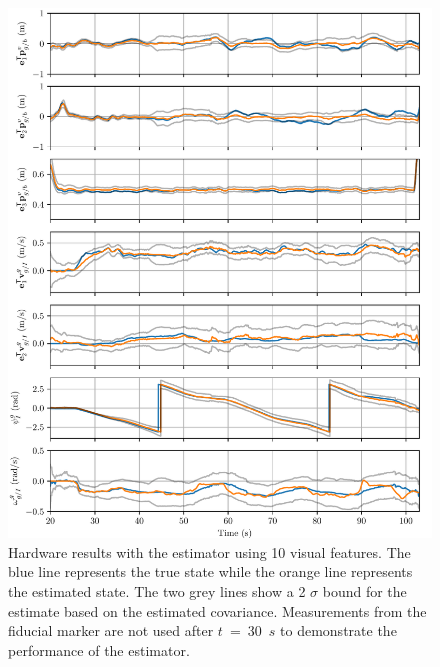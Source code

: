 \begin{figure}
  \centering
  \includegraphics[width=6.5in]{plots/hardware_results}
  \caption{Hardware results with the estimator using 10 visual
  features. The blue line represents the true state while the orange line
  represents the estimated state. The two grey lines show a 2 $\sigma$ bound for
  the estimate based on the estimated covariance. Measurements from the fiducial
  marker are not used after $t$~=~30~$s$ to demonstrate the performance of the estimator.}
  \label{fig:hardware_gp}
\end{figure}
